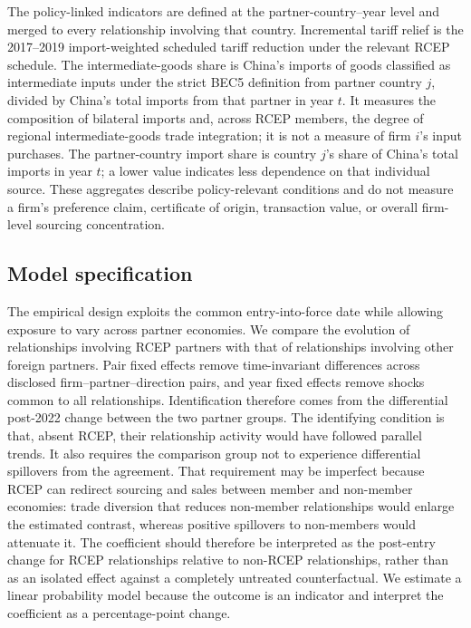 \documentclass[preprint,12pt,authoryear]{elsarticle}
\begin{document}
The policy-linked indicators are defined at the partner-country--year level and merged to every relationship involving that country. Incremental tariff relief is the 2017--2019 import-weighted scheduled tariff reduction under the relevant RCEP schedule. The intermediate-goods share is China's imports of goods classified as intermediate inputs under the strict BEC5 definition from partner country $j$, divided by China's total imports from that partner in year $t$. It measures the composition of bilateral imports and, across RCEP members, the degree of regional intermediate-goods trade integration; it is not a measure of firm $i$'s input purchases. The partner-country import share is country $j$'s share of China's total imports in year $t$; a lower value indicates less dependence on that individual source. These aggregates describe policy-relevant conditions and do not measure a firm's preference claim, certificate of origin, transaction value, or overall firm-level sourcing concentration.

\subsection{Model specification}
\label{sec:strategy}

The empirical design exploits the common entry-into-force date while allowing exposure to vary across partner economies. We compare the evolution of relationships involving RCEP partners with that of relationships involving other foreign partners. Pair fixed effects remove time-invariant differences across disclosed firm--partner--direction pairs, and year fixed effects remove shocks common to all relationships. Identification therefore comes from the differential post-2022 change between the two partner groups. The identifying condition is that, absent RCEP, their relationship activity would have followed parallel trends. It also requires the comparison group not to experience differential spillovers from the agreement. That requirement may be imperfect because RCEP can redirect sourcing and sales between member and non-member economies: trade diversion that reduces non-member relationships would enlarge the estimated contrast, whereas positive spillovers to non-members would attenuate it. The coefficient should therefore be interpreted as the post-entry change for RCEP relationships relative to non-RCEP relationships, rather than as an isolated effect against a completely untreated counterfactual. We estimate a linear probability model because the outcome is an indicator and interpret the coefficient as a percentage-point change.
\end{document}
